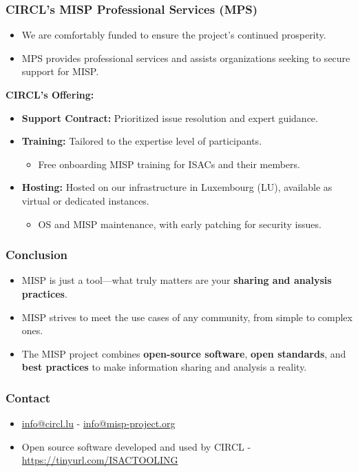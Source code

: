 \begin{frame}
    \frametitle{CIRCL's MISP Professional Services (MPS)}
    \begin{itemize}
        \item We are comfortably funded to ensure the project's continued prosperity.
        \item MPS provides professional services and assists organizations seeking to secure support for MISP.
    \end{itemize}
    \vspace{1em}
    \textbf{CIRCL's Offering:}
    \begin{itemize}
        \item \textbf{Support Contract:} Prioritized issue resolution and expert guidance.
        \item \textbf{Training:} Tailored to the expertise level of participants.
            \begin{itemize}
                \item {\small Free onboarding MISP training for ISACs and their members.}
            \end{itemize}
        \item \textbf{Hosting:} Hosted on our infrastructure in Luxembourg (LU), available as virtual or dedicated instances.
            \begin{itemize}
                \item {\small OS and MISP maintenance, with early patching for security issues.}
            \end{itemize}
    \end{itemize}
\end{frame}

\begin{frame}
    \frametitle{Conclusion}
    \begin{itemize}
        \item MISP is just a tool—what truly matters are your \textbf{sharing and analysis practices}.
        \item MISP strives to meet the use cases of any community, from simple to complex ones.
        \item The MISP project combines \textbf{open-source software}, \textbf{open standards}, and \textbf{best practices} to make information sharing and analysis a reality.
    \end{itemize}
\end{frame}


\begin{frame}
     \frametitle{Contact}
     \begin{itemize}
	     \item \url{info@circl.lu} - \url{info@misp-project.org}
	     \item Open source software developed and used by CIRCL - \url{https://tinyurl.com/ISACTOOLING}
     \end{itemize}
\end{frame}


